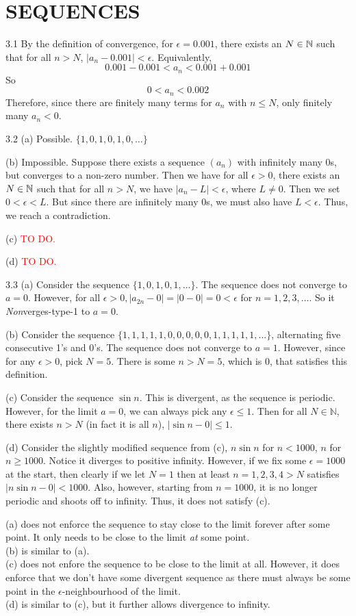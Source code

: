 \section{SEQUENCES}
3.1 By the definition of convergence, for $\epsilon = 0.001$, there exists an $N \in \mathbb{N}$ such that for all $n > N$, $|a_n - 0.001| < \epsilon$. Equivalently,
\[
    0.001 - 0.001 < a_n < 0.001 + 0.001 
\]
So
\[
    0 < a_n < 0.002
\]
Therefore, since there are finitely many terms for $a_n$ with $n \leq N$, only finitely many $a_n < 0$.

3.2 (a) Possible. $\{1,0,1,0,1,0,\dots\}$

(b) Impossible. Suppose there exists a sequence $(a_n)$ with infinitely many 0s, but converges to a non-zero number. Then we have for all $\epsilon > 0$, there exists an
$N \in \mathbb{N}$ such that for all $n>N$, we have $|a_n-L|<\epsilon$, where $L \neq 0$.  
Then we set $0<\epsilon<L$. But since there are infinitely many 0s, we must also have $L<\epsilon$. Thus, we reach a contradiction.

(c) \textcolor{red}{TO DO.}

(d) \textcolor{red}{TO DO.}

3.3 (a) Consider the sequence $\{1,0,1,0,1,\dots\}$. The sequence does not converge to $a=0$. However, for all $\epsilon>0, |a_{2n}-0|=|0-0|=0<\epsilon$ for $n=1,2,3,\dots$. So it \textit{Non}verges-type-1 to $a=0$.

(b) Consider the sequence $\{1,1,1,1,1,0,0,0,0,0,1,1,1,1,1,\dots\}$, alternating five consecutive 1's and 0's. The sequence does not converge to $a=1$. However, since for any $\epsilon>0$, pick $N=5$. There is some $n>N=5$, which is 0, that satisfies this definition. 

(c) Consider the sequence $\sin{n}$. This is divergent, as the sequence is periodic. However, for the limit $a=0$, we can always pick any $\epsilon \leq 1$. Then for all $N \in \mathbb{N}$, there exists $n>N$ (in fact it is all $n$), $|\sin{n}-0|\leq 1$.

(d) Consider the slightly modified sequence from (c), $n \sin{n}$ for $n<1000$, $n$ for $n \geq 1000$. Notice it diverges to positive infinity. However, if we fix some $\epsilon = 1000$ at the start, then clearly if we let $N=1$ then at least $n=1,2,3,4>N$ satisfies $|n \sin{n} - 0| < 1000$. Also, however, starting from $n=1000$, it is no longer periodic and shoots off to infinity.
Thus, it does not satisfy (c).

\begin{remark}
    (a) does not enforce the sequence to stay close to the limit forever after some point. It only needs to be close to the limit \textit{at} some point.
    \\(b) is similar to (a). 
    \\(c) does not enfore the sequence to be close to the limit at all. However, it does enforce that we don't have some divergent sequence as there
    must always be some point in the $\epsilon$-neighbourhood of the limit.
    \\(d) is similar to (c), but it further allows divergence to infinity. 
\end{remark}

